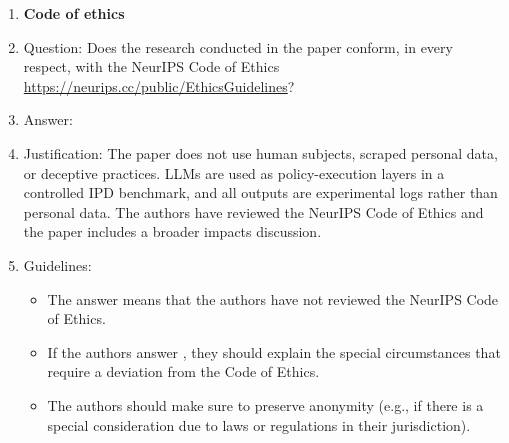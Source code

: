 \begin{enumerate}
\item {\bf Code of ethics}
    \item[] Question: Does the research conducted in the paper conform, in every respect, with the NeurIPS Code of Ethics \url{https://neurips.cc/public/EthicsGuidelines}?
    \item[] Answer: \answerYes{}
    \item[] Justification: The paper does not use human subjects, scraped personal data, or deceptive practices. LLMs are used as policy-execution layers in a controlled IPD benchmark, and all outputs are experimental logs rather than personal data. The authors have reviewed the NeurIPS Code of Ethics and the paper includes a broader impacts discussion.
    \item[] Guidelines:
    \begin{itemize}
        \item The answer \answerNA{} means that the authors have not reviewed the NeurIPS Code of Ethics.
        \item If the authors answer \answerNo, they should explain the special circumstances that require a deviation from the Code of Ethics.
        \item The authors should make sure to preserve anonymity (e.g., if there is a special consideration due to laws or regulations in their jurisdiction).
    \end{itemize}



\end{enumerate}
